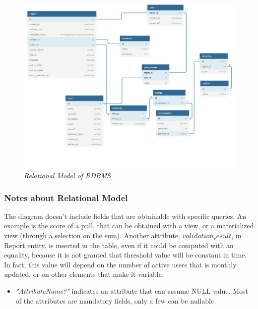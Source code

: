 \begin{figure}[H]
  \centering
  \includegraphics[width=\textwidth]{DD_Images/RelationalModel/RelationalModel.jpg}
  \caption{\textit{Relational Model of RDBMS}}
\end{figure}

\subsubsection{Notes about Relational Model}
The diagram doesn't include fields that are obtainable with specific queries. An example is the score of a pull, that can be obtained 
with a view, or a materialized view (through a selection on the sum). Another attribute, $validation_result$, in Report entity, is 
inserted in the table, even if it could be computed with an equality, because it is not granted that threshold value will be constant 
in time. In fact, this value will depend on the number of active users that is monthly updated, or on other elements that make it 
variable.
\begin{itemize}
  \item \textit{"AttributeName?"} indicates an attribute that can assume NULL value. Most of the attributes are mandatory fields, only a few 
  can be nullable 
\end{itemize}


